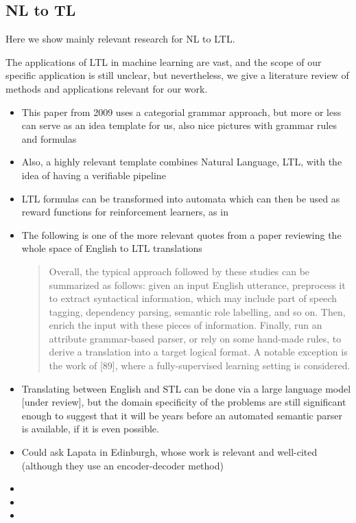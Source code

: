 \documentclass[a4paper, 11pt]{article}
\begin{document}
\subsection{NL to TL}

Here we show mainly relevant research for NL to LTL.

The applications of LTL in machine learning are vast, and the scope of our
specific application is still unclear, but nevertheless, we give a literature
review of methods and applications relevant for our work.

\begin{itemize}



\item This paper \cite{5152776} from 2009 uses a categorial grammar approach, but more or less
  can serve as an idea template for us, also nice pictures with grammar rules
  and formulas
\item Also, a highly relevant template combines Natural Language, LTL, with the
  idea of having a verifiable pipeline \cite{provCorrectNatControl} 
\item LTL formulas can be transformed into automata which can then be used as reward functions for reinforcement learners, as in \cite{ltlRein}

\item  The following is one of the more relevant quotes from a paper reviewing
  the whole space of English to LTL translations
  \begin{quote}
Overall, the typical approach followed by these studies can be summarized as follows:
given an input English utterance, preprocess it to extract syntactical information, which may
include part of speech tagging, dependency parsing, semantic role labelling, and so on. Then,
enrich the input with these pieces of information. Finally, run an attribute grammar-based
parser, or rely on some hand-made rules, to derive a translation into a target logical format.
A notable exception is the work of [89], where a fully-supervised learning setting is considered.
\cite{brunello_et_al}
\end{quote}
\item Translating between English and STL can be done via a large language model 
\cite{he2021english} [under review], but the domain specificity of the problems
are still significant enough to suggest that it will be years before an
automated semantic parser is available, if it is even possible. 
\item Could ask Lapata in Edinburgh, whose work \cite{dong-lapata-2016-language}
  is relevant and well-cited (although they use an encoder-decoder method)
\item
\item
\item

\end{itemize}
\end{document}

